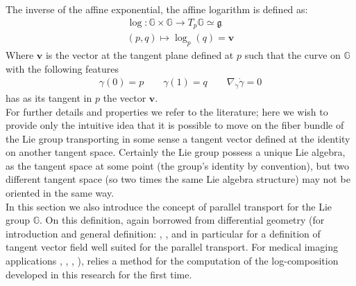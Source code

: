 \noindent
The inverse of the affine exponential, the affine logarithm is defined as:
\begin{align*}
\log :  \mathbb{G}  \times \mathbb{G}   \longrightarrow T_{p}\mathbb{G}   \simeq \mathfrak{g} 
\\ 
(p,q) \longmapsto \log_{p}(q)  = \mathbf{v} 
\end{align*}
Where $\mathbf{v} $ is the vector at the tangent plane defined at $p$ such that the curve on $\mathbb{G} $ with the following features
\begin{align*}
\gamma(0) = p\qquad  \gamma(1) = q \qquad \nabla_{\dot{\gamma}}\dot{\gamma} = 0 
\end{align*}
has as its tangent in $p$ the vector $\mathbf{v}$.\\

For further details and properties we refer to the literature; here we wish to provide only the intuitive idea that it is possible to move on the fiber bundle of the Lie group transporting in some sense a tangent vector defined at the identity on another tangent space. Certainly the Lie group possess a unique Lie algebra, as the tangent space at some point (the group's identity by convention), but two different tangent space (so two times the same Lie algebra structure) may not be oriented in the same way. \\

In this section we also introduce the concept of parallel transport for the Lie group $\mathbb{G}$. On this definition, again borrowed from differential geometry (for introduction and general definition: \cite{misner1973gravitation}, \cite{knebelman1951spaces}, \cite{kheyfets2000schild} and in particular \cite{warner} for a definition of tangent vector field well suited for the parallel transport. For medical imaging applications \cite{lorenzi2011schild}, \cite{pennec2011parallel}, \cite{lorenzi2013geodesics}, \cite{lorenzi2014efficient}), relies a method for the computation of the log-composition developed in this research for the first time.


